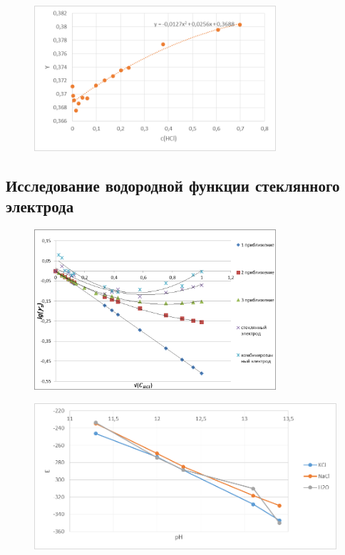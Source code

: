 \documentclass[a4paper, 12pt]{article}
\begin{document}
\begin{figure}[h!]
	\centering
	\caption{}
\includegraphics[width=0.8\textwidth]{image007.png}
\end{figure}
\subsection{Исследование водородной функции стеклянного электрода}


\begin{figure}[h!]
	\centering
	\caption{}
\includegraphics[width=0.8\textwidth]{image013.png}
\end{figure}
\newpage

\begin{figure}[t]
	\centering
	\caption{}
\includegraphics[width=1\textwidth]{image015.png}
\end{figure}
\end{document}
